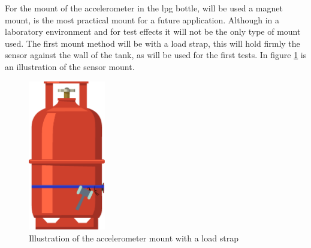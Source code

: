 For the mount of the accelerometer in the \acrshort{lpg} bottle, will be used a magnet mount, is the most practical mount for a future application. Although in a laboratory environment and for test effects it will not be the only type of mount used. The first mount method will be with a load strap, this will hold firmly the sensor against the wall of the tank, as will be used for the first tests. In figure \ref{fig:mounLoadStrap} is an illustration of the sensor mount.

\begin{figure}[]
    \centering
    \includegraphics[width=0.3\textwidth]{Chapters/4CHP/Figures/AccLoadStrap.eps}
    \caption{Illustration of the accelerometer mount with a load strap}
    \label{fig:mounLoadStrap}
\end{figure}

